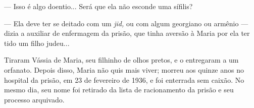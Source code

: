 --- Isso é algo doentio... Será que ela não esconde uma sífilis?

--- Ela deve ter se deitado com um \emph{jid,} ou com algum georgiano ou
armênio --- dizia a auxiliar de enfermagem da prisão, que tinha aversão
à Maria por ela ter tido um filho judeu...

Tiraram Vássia de Maria, seu filhinho de olhos pretos, e o entregaram a
um orfanato. Depois disso, Maria não quis mais viver; morreu aos quinze
anos no hospital da prisão, em 23 de fevereiro de 1936, e foi enterrada
sem caixão. No mesmo dia, seu nome foi retirado da lista de racionamento
da prisão e seu processo arquivado.
